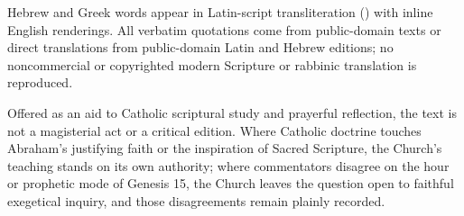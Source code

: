 Hebrew and Greek words appear in Latin-script transliteration () with inline English renderings. All verbatim quotations come from public-domain texts or direct translations from public-domain Latin and Hebrew editions; no noncommercial or copyrighted modern Scripture or rabbinic translation is reproduced.

Offered as an aid to Catholic scriptural study and prayerful reflection, the text is not a magisterial act or a critical edition. Where Catholic doctrine touches Abraham's justifying faith or the inspiration of Sacred Scripture, the Church's teaching stands on its own authority; where commentators disagree on the hour or prophetic mode of Genesis 15, the Church leaves the question open to faithful exegetical inquiry, and those disagreements remain plainly recorded.
